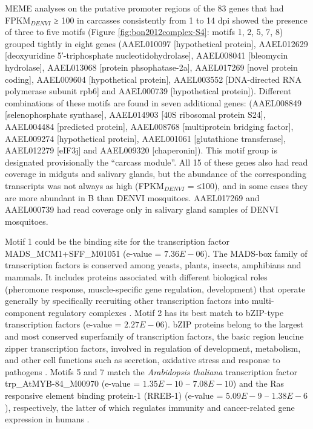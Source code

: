 MEME analyses on the putative promoter regions of the 83 genes that had FPKM$_{DENVI}$ ≥ 100 in carcasses consistently from 1 to 14 \gls{dpi} showed the presence of three to five motifs (Figure \ref{fig:bon2012complex-S4}: motifs 1, 2, 5, 7, 8) grouped tightly in eight genes (AAEL010097 [hypothetical protein], AAEL012629 [deoxyuridine 5′-triphosphate nucleotidohydrolase], AAEL008041 [bleomycin hydrolase], AAEL013068 [protein phsophatase-2a], AAEL017269 [novel protein coding], AAEL009604 [hypothetical protein], AAEL003552 [DNA-directed RNA polymerase subunit rpb6] and AAEL000739 [hypothetical protein]).
Different combinations of these motifs are found in seven additional genes: (AAEL008849 [selenophosphate synthase], AAEL014903 [40S ribosomal protein S24], AAEL004484 [predicted protein], AAEL008768 [multiprotein bridging factor], AAEL009274 [hypothetical protein], AAEL001061 [glutathione transferase], AAEL012279 [eIF3j] and AAEL009320 [chaperonin]).
This motif group is designated provisionally the “carcass module”.
All 15 of these genes also had read coverage in midguts and salivary glands, but the abundance of the corresponding transcripts was not always as high (FPKM$_{DENVI}$ = ≤100), and in some cases they are more abundant in B than \gls{DENVI} mosquitoes.
AAEL017269 and AAEL000739 had read coverage only in salivary gland samples of \gls{DENVI} mosquitoes.

Motif 1 could be the binding site for the transcription factor MADS\_MCM1+SFF\_M01051 (e-value = $7.36E-06$).
The MADS-box family of transcription factors is conserved among yeasts, plants, insects, amphibians and mammals.
It includes proteins associated with different biological roles (pheromone response, muscle-specific gene regulation, development) that operate generally by specifically recruiting other transcription factors into multi-component regulatory complexes \cite{Shore1995}.
Motif 2 has its best match to bZIP-type transcription factors (e-value = $2.27E-06$).
bZIP proteins belong to the largest and most conserved superfamily of transcription factors, the basic region leucine zipper transcription factors, involved in regulation of development, metabolism, and other cell functions such as secretion, oxidative stress and response to pathogens \cite{Miller2009,Abrams2005,Guo2010a}.
Motifs 5 and 7 match the \textit{Arabidopsis thaliana} transcription factor trp\_AtMYB-84\_M00970 (e-value = $1.35E-10$ -- $7.08E-10$) and the Ras responsive element binding protein-1 (RREB-1) (e-value = $5.09E-9$ -- $1.38E-6$), respectively, the latter of which regulates immunity and cancer-related gene expression in humans \cite{Flajollet2009,Liu2009}.

